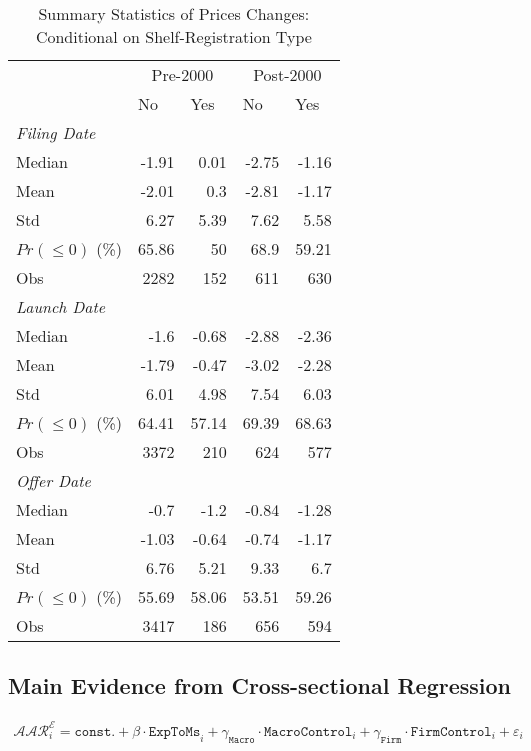 \documentclass[11pt]{article}
\begin{document}
\begin{table}[htbp]
	\centering
	\caption{Summary Statistics of Prices Changes: Conditional on Shelf-Registration Type}
	\begin{tabular}{lrrrr}
		\toprule
		& \multicolumn{2}{c}{Pre-2000} & \multicolumn{2}{c}{Post-2000} \\
		& \multicolumn{1}{l}{No} & \multicolumn{1}{l}{Yes} & \multicolumn{1}{l}{No} & \multicolumn{1}{l}{Yes} \\
		\midrule
		\multicolumn{5}{l}{\textit{Filing Date}}\\
		Median & -1.91 & 0.01  & -2.75 & -1.16 \\
		Mean  & -2.01 & 0.3   & -2.81 & -1.17 \\
		Std   & 6.27  & 5.39  & 7.62  & 5.58 \\
		$ Pr(\leq 0) $ (\%) & 65.86 & 50    & 68.9  & 59.21 \\
		Obs   & 2282  & 152   & 611   & 630\\
		\midrule
		\multicolumn{5}{l}{\textit{Launch Date}}\\
		Median & -1.6  & -0.68 & -2.88 & -2.36 \\
		Mean  & -1.79 & -0.47 & -3.02 & -2.28 \\
		Std   & 6.01  & 4.98  & 7.54  & 6.03 \\
		$ Pr(\leq 0) $ (\%) & 64.41 & 57.14 & 69.39 & 68.63 \\
		Obs   & 3372  & 210   & 624   & 577 \\
		\midrule
		\multicolumn{5}{l}{\textit{Offer Date}} \\
		Median & -0.7  & -1.2  & -0.84 & -1.28 \\
		Mean  & -1.03 & -0.64 & -0.74 & -1.17 \\
		Std   & 6.76  & 5.21  & 9.33  & 6.7 \\
		$ Pr(\leq 0) $ (\%) & 55.69 & 58.06 & 53.51 & 59.26 \\
		Obs   & 3417  & 186   & 656   & 594 \\
		\bottomrule
	\end{tabular}%
	\label{tab:addlabel}%
\end{table}%
\subsection{Main Evidence from Cross-sectional Regression}

\begin{align}
	\mathcal{AAR}^{\mathcal{E}}_{i}=\texttt{const.}+\beta\cdot \mathtt{ExpToMs}_{i}+\gamma_{\texttt{Macro}}\cdot \mathtt{MacroControl}_{i}+\gamma_{\texttt{Firm}}\cdot \mathtt{FirmControl}_{i}+\varepsilon_{i}
\end{align}
\end{document}
